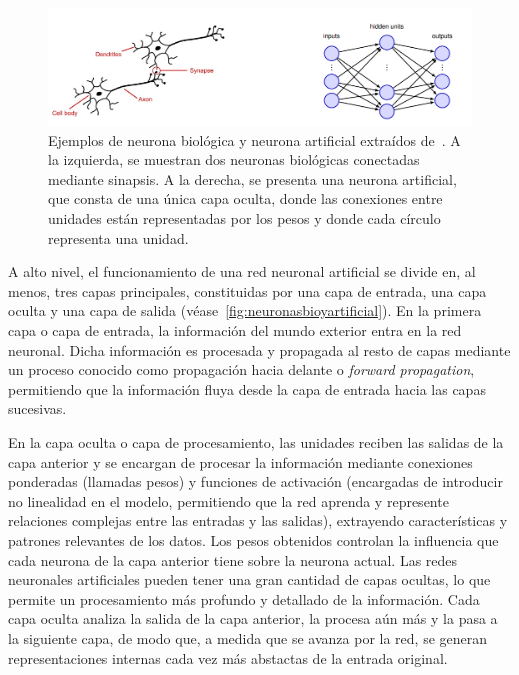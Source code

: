 \begin{figure}[h]
    \centering
    \includegraphics[width=0.8\linewidth]{img/neuronasbioyartificial.png}
    \caption[Ejemplos de neurona biológica y neurona artificial extraídos de~\cite{Bishop2023}.]{Ejemplos de neurona biológica y neurona artificial extraídos de~\cite{Bishop2023}. A la izquierda, se muestran dos neuronas biológicas conectadas mediante sinapsis. A la derecha, se presenta una neurona artificial, que consta de una única capa oculta, donde las conexiones entre unidades están representadas por los pesos y donde cada círculo representa una unidad.}\label{fig:neuronasbioyartificial}
\end{figure}

A alto nivel, el funcionamiento de una red neuronal artificial se divide en, al menos, tres capas principales, constituidas por una capa de entrada, una capa oculta y una capa de salida (véase~\autoref{fig:neuronasbioyartificial}). En la primera capa o capa de entrada, la información del mundo exterior entra en la red neuronal. Dicha información es procesada y propagada al resto de capas mediante un proceso conocido como propagación hacia delante o \emph{forward propagation}, permitiendo que la información fluya desde la capa de entrada hacia las capas sucesivas.\newline

En la capa oculta o capa de procesamiento, las unidades reciben las salidas de la capa anterior y se encargan de procesar la información mediante conexiones ponderadas (llamadas pesos) y funciones de activación (encargadas de introducir no linealidad en el modelo, permitiendo que la red aprenda y represente relaciones complejas entre las entradas y las salidas), extrayendo características y patrones relevantes de los datos. Los pesos obtenidos controlan la influencia que cada neurona de la capa anterior tiene sobre la neurona actual. Las redes neuronales artificiales pueden tener una gran cantidad de capas ocultas, lo que permite un procesamiento más profundo y detallado de la información. Cada capa oculta analiza la salida de la capa anterior, la procesa aún más y la pasa a la siguiente capa, de modo que, a medida que se avanza por la red, se generan representaciones internas cada vez más abstactas de la entrada original.\newline

